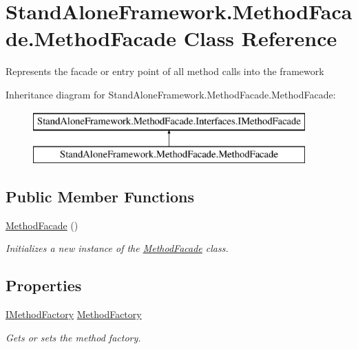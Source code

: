 \hypertarget{class_stand_alone_framework_1_1_method_facade_1_1_method_facade}{\section{Stand\+Alone\+Framework.\+Method\+Facade.\+Method\+Facade Class Reference}
\label{class_stand_alone_framework_1_1_method_facade_1_1_method_facade}
}


Represents the facade or entry point of all method calls into the framework  


Inheritance diagram for Stand\+Alone\+Framework.\+Method\+Facade.\+Method\+Facade\+:\begin{figure}[H]
\begin{center}
\leavevmode
\includegraphics[height=2.000000cm]{class_stand_alone_framework_1_1_method_facade_1_1_method_facade}
\end{center}
\end{figure}
\subsection*{Public Member Functions}
\begin{DoxyCompactItemize}
\item 
\hyperlink{class_stand_alone_framework_1_1_method_facade_1_1_method_facade_a8b2622fdb38b2a9f1bab372ef196b05d}{Method\+Facade} ()
\begin{DoxyCompactList}\small\item\em Initializes a new instance of the \hyperlink{class_stand_alone_framework_1_1_method_facade_1_1_method_facade}{Method\+Facade} class. \end{DoxyCompactList}\end{DoxyCompactItemize}
\subsection*{Properties}
\begin{DoxyCompactItemize}
\item 
\hyperlink{interface_stand_alone_framework_1_1_factories_1_1_interfaces_1_1_i_method_factory}{I\+Method\+Factory} \hyperlink{class_stand_alone_framework_1_1_method_facade_1_1_method_facade_ac9d757f293315f65a4d33668c81f05f4}{Method\+Factory}
\begin{DoxyCompactList}\small\item\em Gets or sets the method factory. \end{DoxyCompactList}\end{DoxyCompactItemize}


